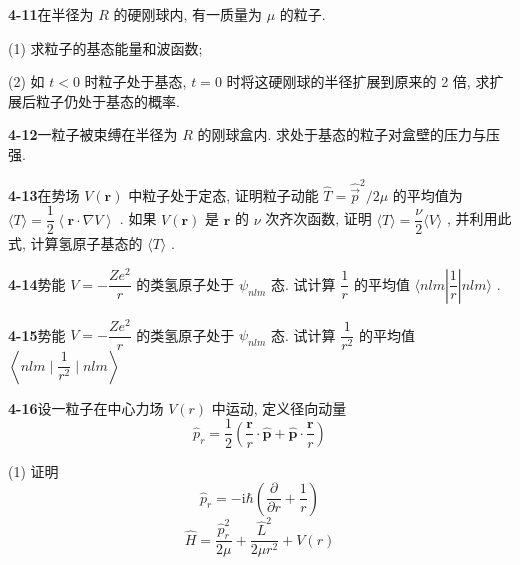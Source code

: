 \vfill

\newpage

\textbf{4-11}\quad 在半径为 $\displaystyle R$ 的硬刚球内, 有一质量为 $\displaystyle \mu$ 的粒子.

(1) 求粒子的基态能量和波函数;

(2) 如 $\displaystyle t < 0$ 时粒子处于基态, $\displaystyle t = 0$ 时将这硬刚球的半径扩展到原来的 2 倍, 求扩展后粒子仍处于基态的概率.

\vfill

\newpage

\textbf{4-12}\quad 一粒子被束缚在半径为 $\displaystyle R$ 的刚球盒内. 求处于基态的粒子对盒壁的压力与压强.

\vfill

\newpage

\textbf{4-13}\quad 在势场 $\displaystyle V(\pmb{r})$ 中粒子处于定态, 证明粒子动能 $\displaystyle \hat{T} = \hat{\vec{p}}^{2} / 2\mu$ 的平均值为 $\displaystyle \langle T\rangle = \dfrac{1}{2}\left\langle \pmb{r} \cdot \nabla V\right\rangle$ . 如果 $\displaystyle V(\pmb{r})$ 是 $\displaystyle \pmb{r}$ 的 $\displaystyle \nu$ 次齐次函数, 证明 $\displaystyle \langle T\rangle = \dfrac{\nu}{2}\langle V\rangle$ , 并利用此式, 计算氢原子基态的 $\displaystyle \langle T\rangle$ .

\vfill

\newpage

\textbf{4-14}\quad 势能 $\displaystyle V = -\dfrac{Ze^2}{r}$ 的类氢原子处于 $\displaystyle \psi_{nlm}$ 态. 试计算 $\displaystyle \dfrac{1}{r}$ 的平均值 $\displaystyle \langle nlm|\dfrac{1}{r}|nlm\rangle$ .

\vfill

\newpage

\textbf{4-15}\quad 势能 $\displaystyle V = -\dfrac{Ze^2}{r}$ 的类氢原子处于 $\displaystyle \psi_{nlm}$ 态. 试计算 $\displaystyle \dfrac{1}{r^2}$ 的平均值 $\displaystyle \left\langle nlm \mid \dfrac{1}{r^2} \mid nlm \right\rangle$

\vfill

\newpage

\textbf{4-16}\quad 设一粒子在中心力场 $\displaystyle V(r)$ 中运动, 定义径向动量
\begin{equation}\tag{1}
\hat {p} _ {r} = \dfrac {1}{2} \left(\dfrac {\boldsymbol {r}}{r} \cdot \hat {\boldsymbol {p}} + \hat {\boldsymbol {p}} \cdot \dfrac {\boldsymbol {r}}{r}\right)
\end{equation}

(1) 证明
\begin{equation}\tag{2}
\hat {p} _ {r} = - \mathrm{i} \hbar \left(\dfrac {\partial}{\partial r} + \dfrac {1}{r}\right)
\end{equation}
\begin{equation}\tag{3}
\hat {H} = \dfrac {\hat {p} _ {r} ^ {2}}{2 \mu} + \dfrac {\hat {L} ^ {2}}{2 \mu r ^ {2}} + V (r)
\end{equation}

